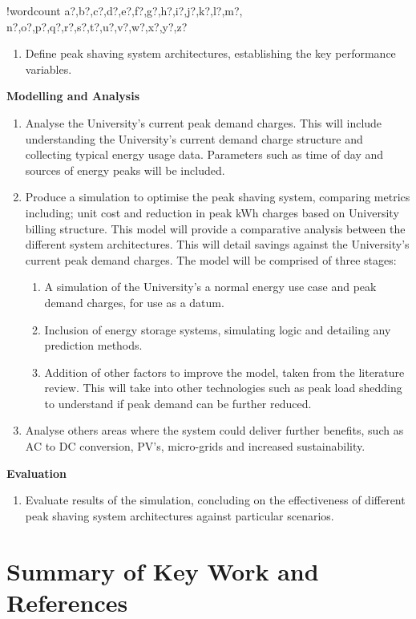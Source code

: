 \documentclass[10pt]{article}
\newcounter{words}
\newenvironment{counted}{%
  \setcounter{words}{0}
  \SearchList!{wordcount}{\stepcounter{words}}
    {a?,b?,c?,d?,e?,f?,g?,h?,i?,j?,k?,l?,m?,
    n?,o?,p?,q?,r?,s?,t?,u?,v?,w?,x?,y?,z?}
  \UndoBoundary{'}
  \SearchOrder{p;}}{%
  \StopSearching}
\begin{document}
\begin{counted}
\begin{enumerate}[resume]
\item Define peak shaving system architectures, establishing the key performance variables.
\end{enumerate}

\textbf{Modelling and Analysis}

\begin{enumerate}[resume]
\item Analyse the University’s current peak demand charges. This will include understanding the University’s current demand charge structure and collecting typical energy usage data. Parameters such as time of day and sources of energy peaks will be included.
\item Produce a simulation to optimise the peak shaving system, comparing metrics including; unit cost and reduction in peak kWh charges based on University billing structure. This model will provide a comparative analysis between the different system architectures. This will detail savings against the University’s current peak demand charges. The model will be comprised of three stages:
\begin{enumerate}
\item A simulation of the University's a normal energy use case and peak demand charges, for use as a datum.
\item Inclusion of energy storage systems, simulating logic and detailing any prediction methods.
\item Addition of other factors to improve the model, taken from the literature review. This will take into other technologies such as peak load shedding to understand if peak demand can be further reduced.
\end{enumerate}
\item Analyse others areas where the system could deliver further benefits, such as AC to DC conversion, PV’s, micro-grids and increased sustainability.
\end{enumerate}

\textbf{Evaluation}

\begin{enumerate}[resume]
\item Evaluate results of the simulation, concluding on the effectiveness of different peak shaving system architectures against particular scenarios.
\end{enumerate}

\newpage

\section{Summary of Key Work and
References}\label{summary-of-key-work-and-references}


\end{counted}
\end{document}
